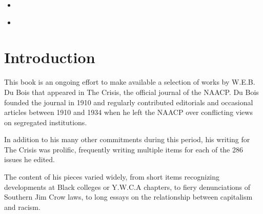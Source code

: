 \documentclass[letterpaper,10pt,english]{jupyterBook}
\begin{document}
\begin{itemize}
\begin{itemize}
\begin{itemize}
\item {} 
\sphinxAtStartPar
{\hyperref[\detokenize{Volumes/40/12/peace::doc}]{}}

\item {} 
\sphinxAtStartPar
{\hyperref[\detokenize{Volumes/41/01/scottsboro::doc}]{}}

\end{itemize}

\end{itemize}

\item {} 
\sphinxAtStartPar
{\hyperref[\detokenize{additional_resources::doc}]{}}

\item {} 
\sphinxAtStartPar
{\hyperref[\detokenize{covers::doc}]{}}

\end{itemize}

\sphinxAtStartPar
{}


\chapter{Introduction}
\label{\detokenize{introduction:introduction}}\label{\detokenize{introduction::doc}}
\sphinxAtStartPar
This book is an ongoing effort to make available a selection of works by W.E.B. Du Bois that appeared in The Crisis, the official journal of the NAACP. Du Bois founded the journal in 1910 and regularly contributed editorials and occasional articles between 1910 and 1934 when he left the NAACP over conflicting views on segregated institutions.

\sphinxAtStartPar
In addition to his many other commitments during this period, his writing for The Crisis was prolific, frequently writing multiple items for each of the 286 issues he edited.

\sphinxAtStartPar
The content of his pieces varied widely, from short items recognizing developments at Black colleges or Y.W.C.A chapters, to fiery denunciations of Southern Jim Crow laws, to long essays on the relationship between capitalism and racism.
\end{document}
